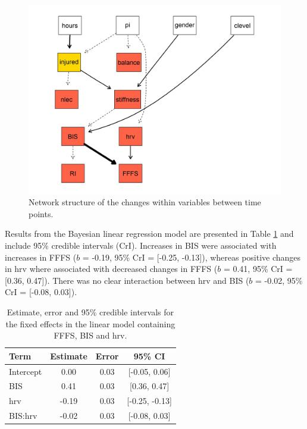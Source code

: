 \documentclass[
  english,
  man]{apa6}
\begin{document}
\begin{figure}

{\centering \includegraphics[width=1\linewidth]{figures_doc/Fig9} 

}

\caption{Network structure of the changes within variables between time points.}\label{fig:fig9}
\end{figure}

Results from the Bayesian linear regression model are presented in Table \ref{tab:table9} and include 95\% credible intervals (CrI).
Increases in BIS were associated with increases in FFFS (\(b\) = -0.19, 95\% CrI = {[}-0.25, -0.13{]}), whereas positive changes in hrv where associated with decreased changes in FFFS (\(b\) = 0.41, 95\% CrI = {[}0.36, 0.47{]}).
There was no clear interaction between hrv and BIS (\(b\) = -0.02, 95\% CrI = {[}-0.08, 0.03{]}).

\begin{table}[H]

\caption{\label{tab:table9}Estimate, error and 95\% credible intervals for the fixed effects in the linear model containing FFFS, BIS and hrv.}
\centering
\begin{tabular}[t]{l|c|c|c}
\hline
\textbf{Term} & \textbf{Estimate} & \textbf{Error} & \textbf{95\% CI}\\
\hline
Intercept & 0.00 & 0.03 & [-0.05, 0.06]\\
\hline
BIS & 0.41 & 0.03 & [0.36, 0.47]\\
\hline
hrv & -0.19 & 0.03 & [-0.25, -0.13]\\
\hline
BIS:hrv & -0.02 & 0.03 & [-0.08, 0.03]\\
\hline
\end{tabular}
\end{table}
\end{document}
